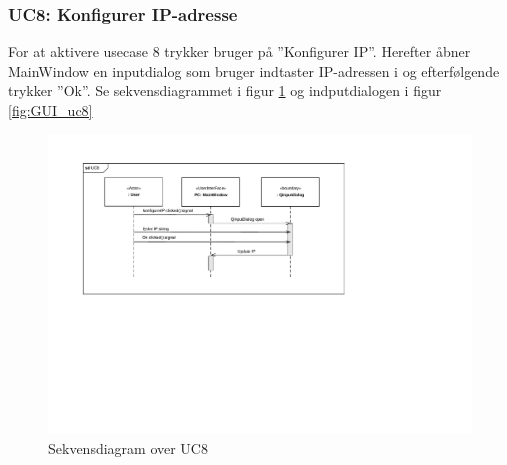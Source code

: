 \subsubsection{UC8: Konfigurer IP-adresse}
For at aktivere usecase 8 trykker bruger på ''Konfigurer IP''. Herefter åbner MainWindow en inputdialog som bruger indtaster IP-adressen i og efterfølgende trykker ''Ok''. Se sekvensdiagrammet i figur \ref{fig:cd_uc8} og indputdialogen i figur \ref{fig:GUI_uc8} 

\begin{figure}[H]
\centering
\includegraphics[width=\textwidth* 2/3,height=\textwidth* 4/10 ]{../fig/diagrammer/pc/sd_uc8.pdf}
\caption{Sekvensdiagram over UC8}
\label{fig:cd_uc8}
\end{figure}

